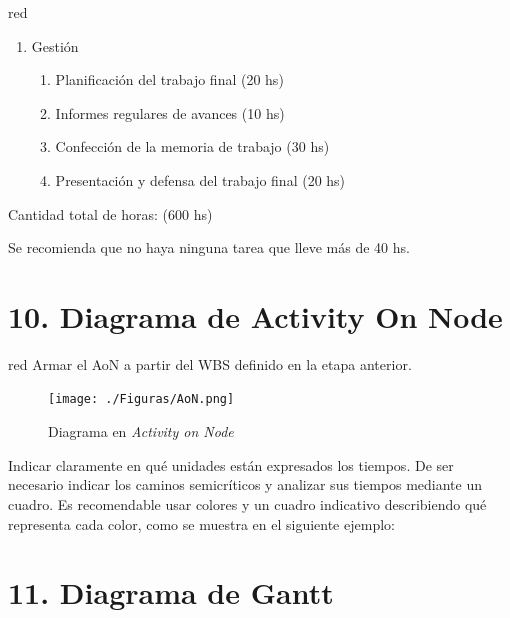 \documentclass[
11pt, %
codirector, %
]{charter}
\begin{document}
\begin{consigna}{red}
\begin{enumerate}
\item Gestión 
	\begin{enumerate}
	\item Planificación del trabajo final (20 hs)
	\item Informes regulares de avances (10 hs)
	\item Confección de la memoria de trabajo (30 hs)
	\item Presentación y defensa del trabajo final (20 hs)
	\end{enumerate}		
\end{enumerate}

Cantidad total de horas: (600 hs)

Se recomienda que no haya ninguna tarea que lleve más de 40 hs. 

\end{consigna}

\section{10. Diagrama de Activity On Node}
\label{sec:AoN}

\begin{consigna}{red}
Armar el AoN a partir del WBS definido en la etapa anterior. 



\end{consigna}

\begin{figure}[htpb]
\centering 
\texttt{[image: ./Figuras/AoN.png]}
\caption{Diagrama en \textit{Activity on Node}}
\label{fig:AoN}
\end{figure}

Indicar claramente en qué unidades están expresados los tiempos.
De ser necesario indicar los caminos semicríticos y analizar sus tiempos mediante un cuadro.
Es recomendable usar colores y un cuadro indicativo describiendo qué representa cada color, como se muestra en el siguiente ejemplo:



\section{11. Diagrama de Gantt}
\label{sec:gantt}
\end{document}
